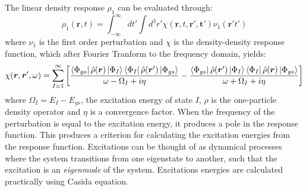 The linear density response $\rho_1$ can be evaluated through:\cite{Ullrich2014}
\begin{equation}\label{equation: density_response}
    \rho_{1}(\bm{r},t)=\int^{\infty}_{-\infty}dt'\int{}d^{3}r'\chi(\bm{r},t,\bm{r}',\bm{t}')\nu_{1}(\bm{r}'t')
\end{equation}
where $\nu_{1}$ is the first order perturbation and $\chi$ is the density-density response function, which after Fourier Tranform to the frequency domain, yields:\cite{Ullrich2012}
\begin{equation}
    \chi(\bm{r},\bm{r}',\omega)=\sum_{I=1}^{\infty}\bigg[\frac{\bra{\Phi_{gs}}\hat{\rho}(\bm{r})\ket{\Phi_{I}}\bra{\Phi_{I}}\hat{\rho}(\bm{r}')\ket{\Phi_{gs}}}{\omega-\Omega_{I}+i\eta{}}-\frac{\bra{\Phi_{gs}}\hat{\rho}(\bm{r}')\ket{\Phi_{I}}\bra{\Phi_{I}}\hat{\rho}(\bm{r})\ket{\Phi_{gs}}}{\omega+\Omega_{I}+i\eta{}}\bigg]
\end{equation}
where $\Omega_{I}=E_{I}-E_{gs}$, the excitation energy of state $I$, $\hat{\rho}$ is the one-particle density operator and $\eta$ is a convergence factor. When the frequency of the perturbation is equal to the excitation energy, it produces a pole in the response function. This produces a criterion for calculating the excitation energies from the response function. Excitations can be thought of as dynamical processes where the system transitions from one eigenstate to another, such that the excitation is an \textit{eigenmode} of the system.\cite{Ullrich2014} Excitations energies are calculated practically using Casida equation.\cite{Casida1995}

